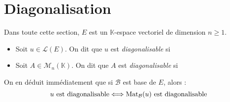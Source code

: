 \documentclass[a4paper,10pt]{report}
\begin{document}
\section{Diagonalisation}
\noindent Dans toute cette section, $E$ est un $\mathbb{K}$-espace vectoriel de dimension $n \geq 1$.


\begin{defin} 
\begin{itemize}
\item Soit $u \in \mathcal{L}(E)$. On dit que $u$ est \textit{diagonalisable} si 

\vspace{0.5cm}
%
\item Soit $A \in \mathcal{M}_n(\mathbb{K})$. On dit que $A$ est \textit{diagonalisable} si 

\vspace{0.5cm}
\end{itemize}
\end{defin}

\noindent On en déduit immédiatement que si $\mathcal{B}$ est base de $E$, alors :
$$ u \hbox{ est diagonalisable} \Longleftrightarrow \textrm{Mat}_{\mathcal{B}}(u) \hbox{ est diagonalisable}$$
\end{document}
